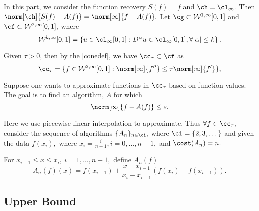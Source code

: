 
In this part, we consider the function recovery $S(f)=f$ and $\ch=\cl_{\infty}.$
Then $\norm[\ch]{S(f)-A(f)}=\norm[\infty]{f-A(f)}.$
Let $\cg \subset \mathcal{W}^{1,\infty}[0,1]$ and $\cf \subset \mathcal{W}^{2,\infty}[0,1],$ where
$$\mathcal{W}^{k,\infty}[0,1]=\left\{u \in \cl_{\infty}[0,1]:D^\alpha u \in \cl_\infty[0,1], \forall |\alpha| \leq k \right\}.$$

Given $\tau>0$, then by the \eqref{conedef}, we have $\cc_{\tau} \subset \cf$ as
\begin{equation}\label{taudef}
\cc_{\tau}=\{f \in  \mathcal{W}^{2,\infty}[0,1] : \norm[\infty]{f''}\leq \tau\norm[\infty]{f'}\},
\end{equation}

Suppose one wants to approximate functions in $\cc_{\tau}$ based on function values.  The goal is to find an algorithm, $A$ for which $$\norm[\infty]{f-A(f)} \le \varepsilon.$$

Here we use piecewise linear interpolation to approximate. Thus $\forall f \in \cc_{\tau},$ consider the sequence of algorithms $\{A_n\}_{n \in \ci},$ where
$\ci=\{2,3,\dots\}$
 and given the data $f(x_i),$ where $ x_i=\frac{i}{n-1}, i=0, \ldots,n-1,$ and $\cost(A_{n})=n.$

For $x_{i-1} \leq x \leq x_i, \ i=1, \ldots, n-1,$ define $A_{n}(f)$
$$A_{n}(f)(x)=f(x_{i-1})+\frac{x-x_{i-1}}{x_i-x_{i-1}}\left(f(x_i)-f(x_{i-1})\right).$$


\subsection{Upper Bound}


